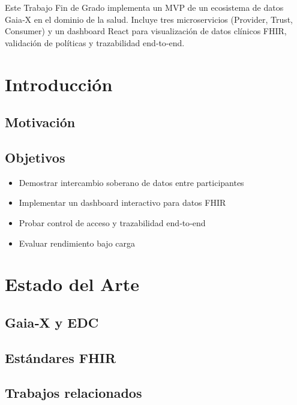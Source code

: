 \documentclass[spanish]{esi-tfg}
\begin{document}
\maketitle
\frontmatter
\begin{resumen}
Este Trabajo Fin de Grado implementa un MVP de un ecosistema de datos Gaia‑X en el dominio de la salud. Incluye tres microservicios (Provider, Trust, Consumer) y un dashboard React para visualización de datos clínicos FHIR, validación de políticas y trazabilidad end‑to‑end.
\end{resumen}

\tableofcontents
\mainmatter

\chapter{Introducción}
\section{Motivación}

\section{Objetivos}
\begin{itemize}
  \item Demostrar intercambio soberano de datos entre participantes
  \item Implementar un dashboard interactivo para datos FHIR
  \item Probar control de acceso y trazabilidad end‑to‑end
  \item Evaluar rendimiento bajo carga
\end{itemize}

\chapter{Estado del Arte}
\section{Gaia‑X y EDC}
\section{Estándares FHIR}
\section{Trabajos relacionados}
\end{document}

